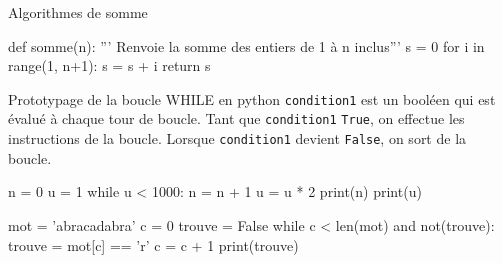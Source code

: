 	\begin{easybox}{Algorithmes de somme}
			\begin{CodePythontexAlt}[TaillePolice=\normalsize, Largeur=1\linewidth,Centre,PremLigne=1, Lignes=true,]{}
			def somme(n):
				''' Renvoie la somme des entiers de 1 à n inclus'''
				s = 0
				for i in range(1, n+1):
					s = s + i
				return s

			\end{CodePythontexAlt}
			\end{easybox}

			\renewcommand{\arraystretch}{1}


\pagebreak

		\begin{easybox}{Prototypage de la boucle WHILE en python}
	\verb|condition1| est un booléen qui est évalué à chaque tour de boucle.  Tant que \verb|condition1| \verb|True|, on effectue les instructions de la boucle. Lorsque \verb|condition1| devient \verb|False|, on sort de la boucle.

	
	\begin{minipage}{0.48\linewidth}
			\begin{CodePythontexAlt}[TaillePolice=\normalsize, Largeur=1\linewidth,Centre,PremLigne=1]{}
			n = 0
			u = 1
			while u < 1000:
				n = n + 1
				u = u * 2
			print(n)
			print(u)
		\end{CodePythontexAlt}
				
		\end{minipage}\hfill
		\begin{minipage}{0.48\linewidth}
			\begin{CodePythontexAlt}[TaillePolice=\normalsize, Largeur=1\linewidth,Centre,PremLigne=1]{}
			mot = 'abracadabra'
			c = 0
			trouve = False
			while c < len(mot) and not(trouve):
				trouve = mot[c] == 'r'
				c = c + 1
			print(trouve)
			\end{CodePythontexAlt}
		\end{minipage}	

			\end{easybox}

